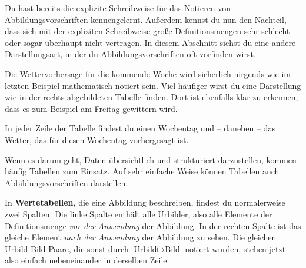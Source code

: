 \documentclass[../../main.tex]{subfiles}
\begin{document}
Du hast bereits die explizite Schreibweise für das Notieren von Abbildungsvorschriften kennengelernt. Außerdem kennst du nun den Nachteil, dass sich mit der expliziten Schreibweise große Definitionsmengen sehr schlecht oder sogar überhaupt nicht vertragen. In diesem Abschnitt siehst du eine andere Darstellungsart, in der du Abbildungsvorschriften oft vorfinden wirst.

\begin{example}{}
    
    Die Wettervorhersage für die kommende Woche wird sicherlich nirgends wie im letzten Beispiel mathematisch notiert sein. Viel häufiger wirst du eine Darstellung wie in der rechts abgebildeten Tabelle finden. Dort ist ebenfalls klar zu erkennen, dass es zum Beispiel am Freitag gewittern wird.
    
    In jeder Zeile der Tabelle findest du einen Wochentag und -- daneben -- das Wetter, das für diesen Wochentag vorhergesagt ist.
\end{example}

Wenn es darum geht, Daten übersichtlich und strukturiert darzustellen, kommen häufig Tabellen zum Einsatz. Auf sehr einfache Weise können Tabellen auch Abbildungsvorschriften darstellen.

In \textbf{Wertetabellen}, die eine Abbildung beschreiben, findest du normalerweise zwei Spalten: Die linke Spalte enthält alle Urbilder, also alle Elemente der Definitionsmenge \emph{vor der Anwendung} der Abbildung. In der rechten Spalte ist das gleiche Element \emph{nach der Anwendung} der Abbildung zu sehen. Die gleichen Urbild-Bild-Paare, die sonst durch $\text{Urbild}\mapsto\text{Bild}$ notiert wurden, stehen jetzt also einfach nebeneinander in derselben Zeile.

\end{document}
